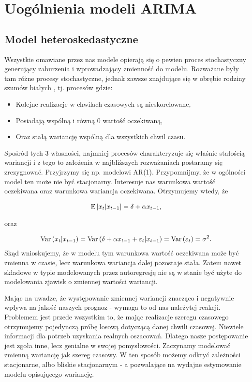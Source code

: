 \documentclass[10pt,a4paper]{book}
\begin{document}
\chapter{Uogólnienia modeli ARIMA}

\section{Model heteroskedastyczne}

Wszystkie omawiane przez nas modele opierają się o pewien proces stochastyczny generujący zaburzenia i wprowadzający zmienność do modelu. Rozważane były tam różne procesy stochastyczne, jednak zawsze znajdujące się w obrębie rodziny szumów białych , tj. procesów gdzie:
\begin{itemize}
\item Kolejne realizacje w chwilach czasowych są nieskorelowane,
\item Posiadają wspólną i równą 0 wartość oczekiwaną,
\item Oraz stałą wariancję wspólną dla wszystkich chwil czasu.
\end{itemize}
Spośród tych 3 własności, najmniej procesów charakteryzuje się właśnie stałością wariancji i z tego to założenia w najbliższych rozważaniach postaramy się zrezygnować. Przyjrzymy się np. modelowi AR(1). Przypomnijmy, że w ogólności model ten może nie być stacjonarny. Interesuje nas warunkowa wartość oczekiwana oraz warunkowa wariancja oczekiwana. Otrzymujemy wtedy, że 

$$
\operatorname{E} \left[ {x_t} \middle| {x_{t-1}} \right] = \delta + \alpha x_{t-1},
$$

oraz

$$
\operatorname{Var} \left( {x_t | x_{t-1}} \right) = \operatorname{Var} \left( { \delta + \alpha x_{t-1} + \varepsilon_t | x_{t-1}} \right) = \operatorname{Var} \left( {\varepsilon_t} \right) = \sigma^2.
$$
Skąd wnioskujemy, że w modelu tym warunkowa wartość oczekiwana może być zmienna w czasie, lecz warunkowa wariancja dalej pozostaje stała. Zatem nawet składowe w typie modelowanych przez autoregresję nie są w stanie być użyte do modelowania zjawisk o zmiennej wartości wariancji. 

Mając na uwadze, że występowanie zmiennej wariancji znacząco i negatywnie wpływa na jakość naszych prognoz - wymaga to od nas należytej reakcji. Problemem jest przede wszystkim to, że mając realizacje szeregu czasowego otrzymujemy pojedynczą próbę losową dotyczącą danej chwili czasowej. Niewiele informacji dla potrzeb uzyskania realnych oszacowań. Dlatego nasze postępowanie jest zgoła inne, lecz genialne w swojej pomysłowości. Zaczynamy modelować zmienną wariancję jak szereg czasowy. W ten sposób możemy odkryć zależności stacjonarne, albo bliskie stacjonarnym - a pozwalające na wydajne estymowanie modelu opisującego wariancję.
\end{document}
